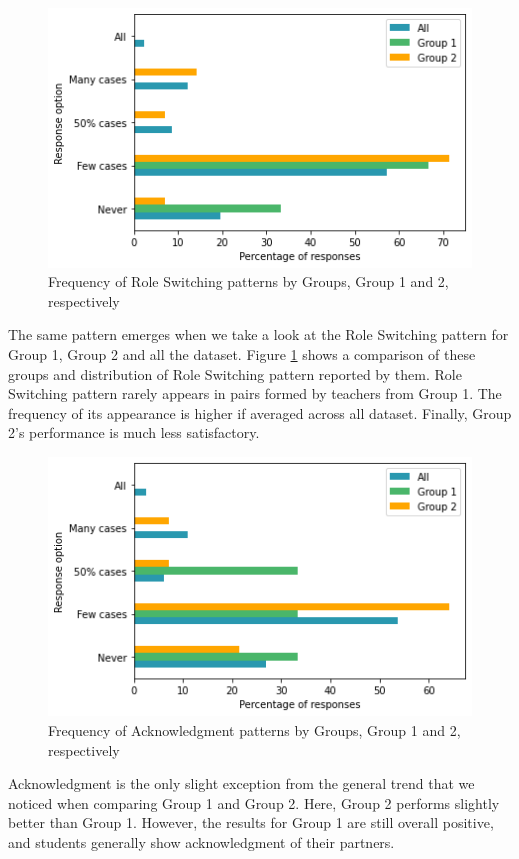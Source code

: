 \documentclass[conference]{IEEEtran}
\begin{document}
\begin{figure}[ht]
\includegraphics[scale=0.5]{role-switch-comparison.png}
\caption{Frequency of Role Switching patterns by Groups, Group 1 and 2, respectively}
\label{fig:roleSwitchCompare}
\end{figure}

The same pattern emerges when we take a look at the Role Switching pattern for Group 1, Group 2 and all the dataset. Figure \ref{fig:roleSwitchCompare} shows a comparison of these groups and distribution of Role Switching pattern reported by them. Role Switching pattern rarely appears in pairs formed by teachers from Group 1. The frequency of its appearance is higher if averaged across all dataset. Finally, Group 2's performance is much less satisfactory.

\begin{figure}[ht]
\includegraphics[scale=0.5]{ack-comparison.png}
\caption{Frequency of Acknowledgment patterns by Groups, Group 1 and 2, respectively}
\label{fig:ackCompare}
\end{figure}

Acknowledgment is the only slight exception from the general trend that we noticed when comparing Group 1 and Group 2. Here, Group 2 performs slightly better than Group 1. However, the results for Group 1 are still overall positive, and students generally show acknowledgment of their partners.
\end{document}
